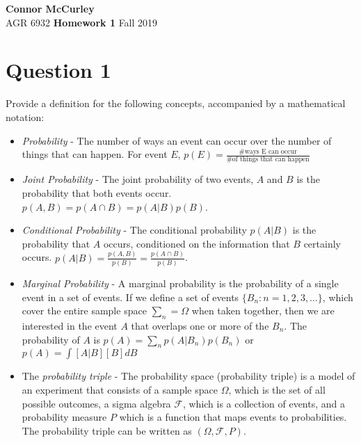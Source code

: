 \documentclass{article}[12 pt]
\begin{document}
	
\begin{center}
	\textbf{\Large Connor McCurley} \\
	AGR 6932  \qquad \quad \quad \textbf{\large Homework 1} \quad \quad \qquad Fall 2019 
\end{center}



\section*{Question 1}
Provide a definition for the following concepts, accompanied by a mathematical notation:
\begin{itemize}
	\item \textit{Probability} - The number of ways an event can occur over the number of things that can happen.  For event $E$, $p(E) = \frac{\text{\# ways E can occur}}{\text{\# of things that can happen}}$
	\item \textit{Joint Probability} - The joint probability of two events, $A$ and $B$ is the probability that both events occur. $p(A,B)=p(A\cap B) = p(A|B)p(B)$.
	\item \textit{Conditional Probability} - The conditional probability $p(A|B)$ is the probability that $A$ occurs, conditioned on the information that $B$ certainly occurs.  $p(A|B) = \frac{p(A,B)}{p(B)}=\frac{p(A \cap B)}{p(B)}$.
	\item \textit{Marginal Probability} - A marginal probability is the probability of a single event in a set of events.  If we define a set of events $\{B_{n}: n=1,2,3,\dots\}$, which  cover the entire sample space $\sum_{n}=\Omega$ when taken together, then we are interested in the event $A$ that overlaps one or more of the $B_{n}$.  The probability of $A$ is $p(A)=\sum_{n}p(A|B_n)p(B_n)$ or  $p(A) = \int [A|B][B]dB$
	\item The \textit{probability triple} - The probability space (probability triple) is a model of an experiment that consists of a sample space $\Omega$, which is the set of all possible outcomes, a sigma algebra $\mathcal{F}$, which is a collection of events, and a probability measure $P$ which is a function that maps events to probabilities. The probability triple can be written as $(\Omega, \mathcal{F}, P)$.
\end{itemize}
\end{document}
